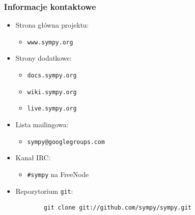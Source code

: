 \documentclass[10pt]{beamer}
\begin{document}
\begin{frame}[fragile]
    \frametitle{Informacje kontaktowe}

    \begin{itemize}
        \item Strona główna projektu:
            \begin{itemize}
                \item \texttt{www.sympy.org}
            \end{itemize}
        \item Strony dodatkowe:
            \begin{itemize}
                \item \texttt{docs.sympy.org}
                \item \texttt{wiki.sympy.org}
                \item \texttt{live.sympy.org}
            \end{itemize}
        \pause
        \item Lista mailingowa:
            \begin{itemize}
                \item \texttt{sympy@googlegroups.com}
            \end{itemize}
        \item Kanał IRC:
            \begin{itemize}
                \item \texttt{\#sympy} na FreeNode
            \end{itemize}
        \pause
        \item Repozytorium \texttt{git}:
        \begin{verbatim}
        git clone git://github.com/sympy/sympy.git
        \end{verbatim}
    \end{itemize}
\end{frame}
\end{document}
